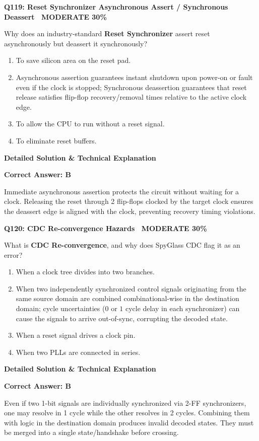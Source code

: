 \documentclass[11pt,a4paper]{article}
\newcommand{\badgemod}{{\color{white}\colorbox{modoran}{\bfseries\sffamily\tiny\ MODERATE 30\%\ }}}
\newenvironment{qbox}[2]{%
  \begin{mdframed}[style=qstyle]%
  {\bfseries\sffamily\color{primaryblue}#1 \hfill #2}\par\vspace{2pt}%
}{%
  \end{mdframed}%
}
\newenvironment{ansbox}{%
  \begin{mdframed}[style=ansstyle]%
  {\bfseries\sffamily\color{ansgreen}\small Detailed Solution \& Technical Explanation}\par\vspace{2pt}\small%
}{%
  \end{mdframed}%
}
\begin{document}
\begin{qbox}{Q119: Reset Synchronizer Asynchronous Assert / Synchronous Deassert}{\badgemod}
Why does an industry-standard \textbf{Reset Synchronizer} assert reset asynchronously but deassert it synchronously?
\begin{enumerate}[label=\textbf{\Alph*.}]
  \item To save silicon area on the reset pad.
  \item Asynchronous assertion guarantees instant shutdown upon power-on or fault even if the clock is stopped; Synchronous deassertion guarantees that reset release satisfies flip-flop recovery/removal times relative to the active clock edge.
  \item To allow the CPU to run without a reset signal.
  \item To eliminate reset buffers.
\end{enumerate}
\end{qbox}
\begin{ansbox}
\textbf{Correct Answer: B}

Immediate asynchronous assertion protects the circuit without waiting for a clock. Releasing the reset through 2 flip-flops clocked by the target clock ensures the deassert edge is aligned with the clock, preventing recovery timing violations.
\end{ansbox}

\begin{qbox}{Q120: CDC Re-convergence Hazards}{\badgemod}
What is \textbf{CDC Re-convergence}, and why does SpyGlass CDC flag it as an error?
\begin{enumerate}[label=\textbf{\Alph*.}]
  \item When a clock tree divides into two branches.
  \item When two independently synchronized control signals originating from the same source domain are combined combinational-wise in the destination domain; cycle uncertainties ($0$ or $1$ cycle delay in each synchronizer) can cause the signals to arrive out-of-sync, corrupting the decoded state.
  \item When a reset signal drives a clock pin.
  \item When two PLLs are connected in series.
\end{enumerate}
\end{qbox}
\begin{ansbox}
\textbf{Correct Answer: B}

Even if two 1-bit signals are individually synchronized via 2-FF synchronizers, one may resolve in 1 cycle while the other resolves in 2 cycles. Combining them with logic in the destination domain produces invalid decoded states. They must be merged into a single state/handshake before crossing.
\end{ansbox}
\end{document}
